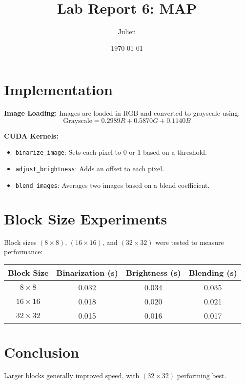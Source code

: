 \documentclass{article}
\title{Lab Report 6: MAP}
\author{Julien}
\date{\today}
\begin{document}
\maketitle


\section{Implementation}
\textbf{Image Loading:} Images are loaded in RGB and converted to grayscale using:
\[
\text{Grayscale} = 0.2989 R + 0.5870 G + 0.1140 B
\]

\textbf{CUDA Kernels:} 
\begin{itemize}
    \item \texttt{binarize\_image}: Sets each pixel to 0 or 1 based on a threshold.
    \item \texttt{adjust\_brightness}: Adds an offset to each pixel.
    \item \texttt{blend\_images}: Averages two images based on a blend coefficient.
\end{itemize}

\section{Block Size Experiments}
Block sizes $(8 \times 8)$, $(16 \times 16)$, and $(32 \times 32)$ were tested to measure performance:

\begin{table}[h!]
\centering
\begin{tabular}{|c|c|c|c|}
\hline
\textbf{Block Size} & \textbf{Binarization (s)} & \textbf{Brightness (s)} & \textbf{Blending (s)} \\
\hline
$8 \times 8$ & 0.032 & 0.034 & 0.035 \\
$16 \times 16$ & 0.018 & 0.020 & 0.021 \\
$32 \times 32$ & 0.015 & 0.016 & 0.017 \\
\hline
\end{tabular}
\end{table}

\section{Conclusion}
Larger blocks generally improved speed, with $(32 \times 32)$ performing best.
\end{document}

